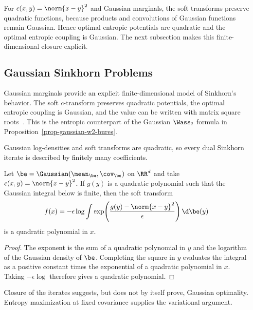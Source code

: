 \begin{rem}\label{rem-sinkhorn-gaussian-marginals}
	For $c(x,y)=\norm{x-y}^2$ and Gaussian marginals, the soft transforms preserve quadratic functions, because products and convolutions of Gaussian functions remain Gaussian. Hence optimal entropic potentials are quadratic and the optimal entropic coupling is Gaussian. The next subsection makes this finite-dimensional closure explicit.
\end{rem}


\subsection{Gaussian Sinkhorn Problems}
\label{sec-gaussian-sinkhorn}

Gaussian marginals provide an explicit finite-dimensional model of Sinkhorn's behavior. The soft $c$-transform preserves quadratic potentials, the optimal entropic coupling is Gaussian, and the value can be written with matrix square roots~\cite{janati2020gaussian}. This is the entropic counterpart of the Gaussian $\Wass_2$ formula in Proposition~\ref{prop-gaussian-w2-bures}.

Gaussian log-densities and soft transforms are quadratic, so every dual Sinkhorn iterate is described by finitely many coefficients.

\begin{prop}\label{prop-gaussian-sinkhorn-closure}
	Let $\be=\Gaussian(\mean_\be,\cov_\be)$ on $\RR^d$ and take $c(x,y)=\norm{x-y}^2$. If $g(y)$ is a quadratic polynomial such that the Gaussian integral below is finite, then the soft transform
	\[
		f(x)
		=
		-\epsilon\log
		\int
		\exp\!\left(\frac{g(y)-\norm{x-y}^2}{\epsilon}\right)
		\d\be(y)
	\]
	is a quadratic polynomial in $x$.
\end{prop}

\begin{proof}
	The exponent is the sum of a quadratic polynomial in $y$ and the logarithm of the Gaussian density of $\be$. Completing the square in $y$ evaluates the integral as a positive constant times the exponential of a quadratic polynomial in $x$. Taking $-\epsilon\log$ therefore gives a quadratic polynomial.
\end{proof}

Closure of the iterates suggests, but does not by itself prove, Gaussian optimality. Entropy maximization at fixed covariance supplies the variational argument.

